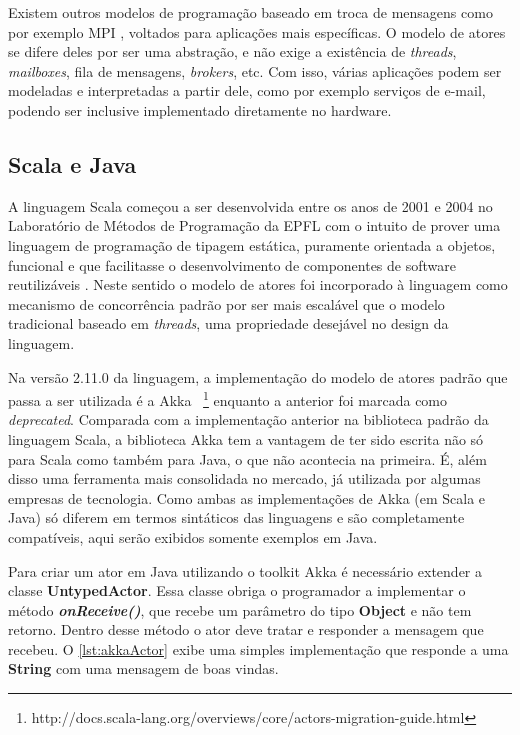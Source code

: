 Existem outros modelos de programação baseado em troca de mensagens como por exemplo MPI \cite{Gropp1996}, voltados para aplicações mais específicas. O modelo de atores se difere deles por ser uma abstração, e não exige a existência de \textit{threads}, \textit{mailboxes}, fila de mensagens, \textit{brokers}, etc. Com isso, várias aplicações podem ser modeladas e interpretadas a partir dele, como por exemplo serviços de e-mail, podendo ser inclusive implementado diretamente no hardware. 

\subsection{Scala e Java}
A linguagem Scala começou a ser desenvolvida entre os anos de 2001 e 2004 no Laboratório de Métodos de Programação da EPFL com o intuito de prover
uma linguagem de programação de tipagem estática, puramente orientada a objetos, funcional e que facilitasse o desenvolvimento de componentes de software reutilizáveis \cite{Odersky2004}. Neste sentido o modelo de atores foi incorporado à linguagem como mecanismo de concorrência padrão por ser mais escalável que o modelo tradicional baseado em \textit{threads}, uma propriedade desejável no design da linguagem.

Na versão 2.11.0 da linguagem, a implementação do modelo de atores padrão que passa a ser utilizada é a Akka~
\footnote{http://docs.scala-lang.org/overviews/core/actors-migration-guide.html} enquanto a anterior foi marcada como \textit{deprecated}. Comparada com a implementação anterior na biblioteca padrão da linguagem Scala, a biblioteca Akka tem a vantagem de ter sido escrita não só para Scala como também para Java, o que não acontecia na primeira. É, além disso uma ferramenta mais consolidada no mercado, já utilizada por algumas empresas de tecnologia. Como ambas as implementações de Akka (em Scala e Java) só diferem em termos sintáticos das linguagens e são completamente compatíveis, aqui serão exibidos somente exemplos em Java.

Para criar um ator em Java utilizando o toolkit Akka é necessário extender a classe \textbf{UntypedActor}. Essa classe obriga o programador a implementar o método \textit{\textbf{onReceive()}}, que recebe um parâmetro do tipo \textbf{Object} e não tem retorno. Dentro desse método o ator deve tratar e responder a mensagem que recebeu. O \autoref{lst:akkaActor} exibe uma simples implementação que responde a uma \textbf{String} com uma mensagem de boas vindas.

